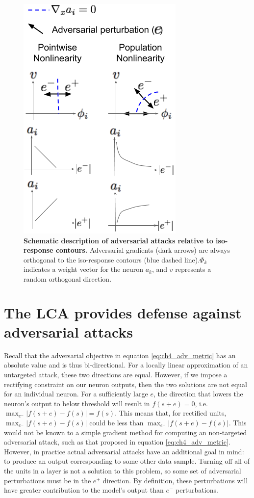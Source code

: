 \begin{figure}
    \begin{center}
    \centerline{\includegraphics[width=0.45\columnwidth]{figures/adversarial_gradients_iso_contours.png}}
    \end{center}
    \caption{\textbf{Schematic description of adversarial attacks relative to iso-response contours.} Adversarial gradients (dark arrows) are always orthogonal to the iso-response contours (blue dashed line).$\Phi_{k}$ indicates a weight vector for the neuron $a_{k}$, and $v$ represents a random orthogonal direction.}
    \label{fig:ch4_adv_grads}
\end{figure}

\section{The LCA provides defense against adversarial attacks}
Recall that the adversarial objective in equation \eqref{eq:ch4_adv_metric} has an absolute value and is thus bi-directional.
For a locally linear approximation of an untargeted attack, these two directions are equal.
However, if we impose a rectifying constraint on our neuron outputs, then the two solutions are not equal for an individual neuron.
For a sufficiently large $e$, the direction that lowers the neuron's output to below threshold will result in $f(s+e)=0$, i.e. $\max_{e^{-}}|f(s+e)-f(s)| = f(s)$.
This means that, for rectified units, $\max_{e^{-}}|f(s+e)-f(s)|$ could be less than $\max_{e^{+}}|f(s+e)-f(s)|$.
This would not be known to a simple gradient method for computing an non-targeted adversarial attack, such as that proposed in equation \eqref{eq:ch4_adv_metric}.
However, in practice actual adversarial attacks have an additional goal in mind: to produce an output corresponding to some other data sample.
Turning off all of the units in a layer is not a solution to this problem, so some set of adversarial perturbations must be in the $e^{+}$ direction.
By definition, these perturbations will have greater contribution to the model's output than $e^{-}$ perturbations.

